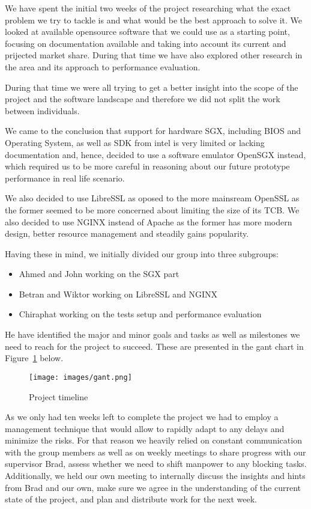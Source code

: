 \documentclass[../main.tex]{subfiles}
\begin{document}
We have spent the initial two weeks of the project researching what the exact
problem we try to tackle is and what would be the best approach to solve it.
We looked at available opensource software that we could use as a starting
point, focusing on documentation available and taking into account its current
and prijected market share. During that time we have also explored other
research in the area and its approach to performance evaluation.

During that time we were all trying to get a better insight into the scope of
the project and the software landscape and therefore we did not split the work
between individuals.

We came to the conclusion that support for hardware SGX, including BIOS and
Operating System, as well as SDK from intel is very limited or lacking
documentation and, hence, decided to use a software emulator OpenSGX instead,
which required us to be more careful in reasoning about our future prototype
performance in real life scenario.

We also decided to use LibreSSL as oposed to the more mainsream OpenSSL as the
former seemed to be more concerned about limiting the size of its TCB. We also
decided to use NGINX instead of Apache as the former has more modern design,
better resource management and steadily gains popularity.

Having these in mind, we initially divided our group into three subgroups:
\begin{itemize}
	\item Ahmed and John working on the SGX part
	\item Betran and Wiktor working on LibreSSL and NGINX
	\item Chiraphat working on the tests setup and performance evaluation
\end{itemize}

He have identified the major and minor goals and tasks as well as milestones
we need to reach for the project to succeed. These are presented in the gant
chart in Figure~\ref{fig:gantchart} below.

\begin{figure}[H]
  \centering
  \texttt{[image: images/gant.png]}
  \caption{Project timeline}
  \label{fig:gantchart}
\end{figure}

As we only had ten weeks left to complete the project we had to employ
a management technique that would allow to rapidly adapt to any delays and
minimize the risks. For that reason we heavily relied on constant
communication with the group members as well as on weekly meetings to share
progress with our supervisor Brad, assess whether we need to shift manpower to
any blocking tasks. Additionally, we held our own meeting to internally
discuss the insights and hints from Brad and our own, make sure we agree in the
understanding of the current state of the project, and plan and distribute
work for the next week.\\
\end{document}
